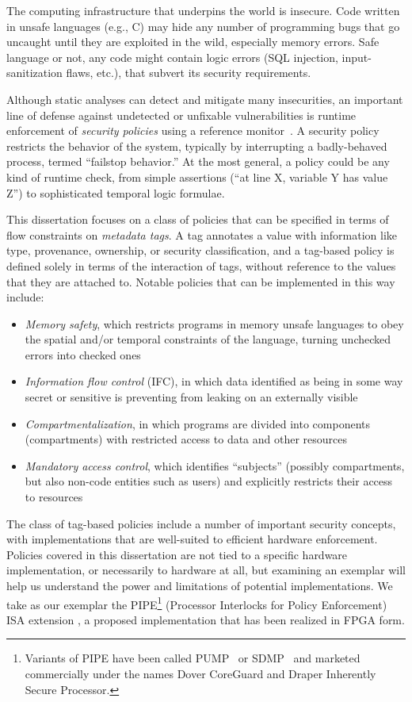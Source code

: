The computing infrastructure that underpins the world is insecure. Code written
in unsafe languages (e.g., C) may hide any number of programming bugs that go uncaught
until they are exploited in the wild, especially memory errors. Safe language or not, any code
might contain logic errors (SQL injection, input-sanitization flaws, etc.), that subvert
its security requirements.

Although static analyses can detect and mitigate many insecurities, an important line of
defense against undetected or unfixable vulnerabilities is runtime enforcement of
{\em security policies} using a reference monitor~\cite{Anderson72:PlanningStudy}.
A security policy restricts the behavior of the system, typically by interrupting
a badly-behaved process, termed ``failstop behavior.'' At the most general, a policy could be
any kind of runtime check, from simple assertions (``at line X, variable Y has value Z'') to
sophisticated temporal logic formulae.

This dissertation focuses on a class of policies that can be specified in terms of flow constraints
on \emph{metadata tags}. A tag annotates a value with information like type, provenance,
ownership, or security classification, and a tag-based policy is defined solely in terms of
the interaction of tags, without reference to the values that they are attached to.
Notable policies that can be implemented in this way include:

\begin{itemize}
\item {\em Memory safety}, which restricts programs in memory unsafe languages to obey
  the spatial and/or temporal constraints of the language, turning unchecked errors into
  checked ones
\item {\em Information flow control} (IFC), in which data identified as being in some way secret
  or sensitive is preventing from leaking on an externally visible
\item {\em Compartmentalization}, in which programs are divided into components (compartments)
  with restricted access to data and other resources
\item {\em Mandatory access control}, which identifies ``subjects'' (possibly compartments,
  but also non-code entities such as users) and explicitly restricts their access to resources
\end{itemize}

The class of tag-based policies include a number of important security concepts, with implementations
that are well-suited to efficient hardware enforcement. Policies covered in this dissertation are not
tied to a specific hardware implementation, or necessarily to hardware at all, but examining
an exemplar will help us understand the power and limitations of potential implementations.
We take as our exemplar the PIPE\footnote{ Variants of PIPE have
been called PUMP~\cite{Dhawan+15} or SDMP~\cite{RoesslerD18} and marketed commercially
under the names Dover CoreGuard and Draper Inherently Secure Processor.}
(Processor Interlocks for Policy Enforcement) ISA extension \cite{Azevedo+16,Azevedo+15},
a proposed implementation that has been realized in FPGA form.

